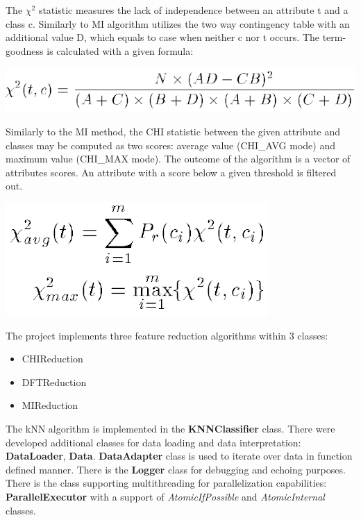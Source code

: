 \documentclass[12pt,a4paper]{report}
\begin{document}
The \({\chi}^2\) statistic measures the lack of independence between an attribute t and a class c. Similarly to MI algorithm utilizes the two way contingency table with an additional value D, which equals to case when neither c nor t occurs. The term-goodness is calculated with a given formula:

\includegraphics[scale=0.8]{CHI1}

Similarly to the MI method, the CHI statistic between the given attribute and classes may be computed as two scores: average value (CHI\_AVG mode) and maximum value (CHI\_MAX mode). The outcome of the algorithm is a vector of attributes scores. An attribute with a score below a given threshold is filtered out.

\includegraphics[scale=0.8]{CHI_scores}

The project implements three feature reduction algorithms within 3 classes:
\begin{itemize}
  \item CHIReduction
  \item DFTReduction
  \item MIReduction
\end{itemize}
The kNN algorithm is implemented in the \textbf{KNNClassifier} class. There were developed additional classes for data loading and data interpretation: \textbf{DataLoader}, \textbf{Data}. \textbf{DataAdapter} class is used to iterate over data in function defined manner. There is the \textbf{Logger} class for debugging and echoing purposes. There is the class supporting multithreading  for parallelization capabilities: \textbf{ParallelExecutor} with a support of \emph{AtomicIfPossible} and \emph{AtomicInternal} classes.
\end{document}
